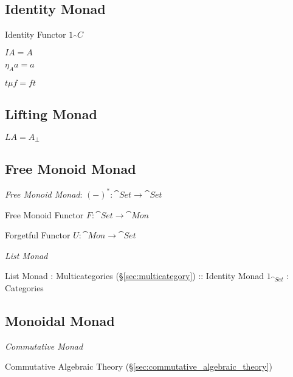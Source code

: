 \subsection{Identity Monad}\label{sec:identity_monad}

Identity Functor $1_\cat{C}$

$I A = A$

$\eta_A a = a$

$t \mu f = f t$



\subsection{Lifting Monad}\label{sec:lifting_monad}

$L A = A_\bot$




\subsection{Free Monoid Monad}\label{sec:free_monoid_monad}

\emph{Free Monoid Monad}: $(-)^* : \cat{Set} \rightarrow \cat{Set}$

Free Monoid Functor $F : \cat{Set} \rightarrow \cat{Mon}$

Forgetful Functor $U : \cat{Mon} \rightarrow \cat{Set}$

\emph{List Monad}

List Monad : Multicategories (\S\ref{sec:multicategory}) :: Identity
Monad $1_{\cat{Set}}$ : Categories



\subsection{Monoidal Monad}\label{sec:monoidal_monad}

\emph{Commutative Monad}

Commutative Algebraic Theory
(\S\ref{sec:commutative_algebraic_theory})

